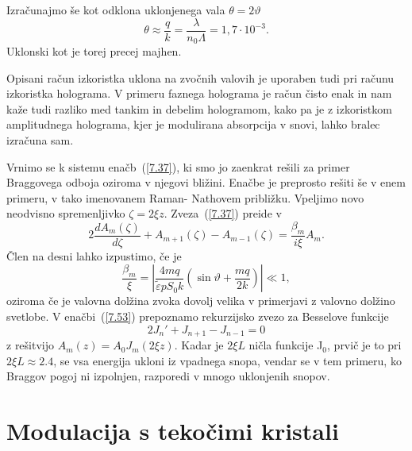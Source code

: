 Izračunajmo še kot odklona uklonjenega vala $\theta = 2 \vartheta$  
\begin{equation}
\theta \approx \frac{q}{k}=\frac{\lambda}{n_{0}\Lambda}=1,7\cdot10^{-3}
.\label{7.52}
\end{equation}
Uklonski kot je torej precej majhen.

\begin{remark}
Opisani račun izkoristka uklona na zvočnih valovih je uporaben tudi
pri računu izkoristka holograma. V primeru faznega holograma je račun
čisto enak in nam kaže tudi razliko med tankim in debelim hologramom,
kako pa je z izkoristkom amplitudnega holograma, kjer je modulirana
absorpcija v snovi, lahko bralec izračuna sam.
\end{remark}

Vrnimo se k sistemu enačb~(\ref{7.37}), ki smo jo zaenkrat rešili za primer Braggovega odboja
oziroma v njegovi bližini. Enačbe je preprosto rešiti še v enem primeru, v tako imenovanem
Raman- Nathovem približku. Vpeljimo novo neodvisno spremenljivko $\zeta=2\xi z$. Zveza~(\ref{7.37})
preide v 
\begin{equation}
2\frac{dA_{m}(\zeta)}{d\zeta}+A_{m+1}(\zeta)-A_{m-1}(\zeta)=\frac{\beta_{m}}{i\xi}A_{m}.
\label{7.53}
\end{equation}
 Člen na desni lahko izpustimo, če je 
\begin{equation}
\frac{\beta_{m}}{\xi}=\left| \frac{4mq}{\tilde{\varepsilon}pS_0k}(\sin\vartheta+\frac{mq}{2k})\right| 
\ll 1,
\label{7.54}
\end{equation}
oziroma če je valovna dolžina zvoka dovolj velika v primerjavi z valovno dolžino svetlobe. 
V enačbi~(\ref{7.53}) prepoznamo rekurzijsko zvezo za Besselove funkcije 
\begin{equation}
2J_{n}'+J_{n+1}-J_{n-1}=0
\label{7.55}
\end{equation}
z rešitvijo $A_{m}(z)=A_{0}J_{m}(2\xi z)$. Kadar je $2\xi L$ ničla funkcije
J$_{0}$, prvič je to pri $2\xi L\approx 2.4$, se vsa energija ukloni iz
vpadnega snopa, vendar se v tem primeru, ko Braggov pogoj ni izpolnjen,
razporedi v mnogo uklonjenih snopov.

\section{Modulacija s tekočimi kristali}

